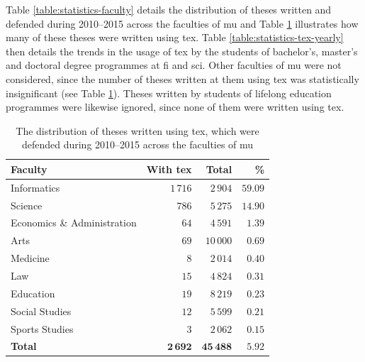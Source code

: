 \documentclass[digital,table,color]{fithesis3/fithesis3}
\begin{document}
  Table \ref{table:statistics-faculty} details the distribution of
  theses written and defended during 2010--2015 across the
  faculties of \gls{mu} and Table \ref{table:statistics-tex}
  illustrates how many of these theses were written using
  \gls{tex}. Table \ref{table:statistics-tex-yearly} then details
  the trends in the usage of \gls{tex} by the students of
  bachelor's, master's and doctoral degree programmes at \gls{fi}
  and \gls{sci}. Other faculties of \gls{mu} were not considered,
  since the number of theses written at them using \gls{tex} was
  statistically insignificant (see Table
  \ref{table:statistics-tex}). Theses written by students of
  lifelong education programmes were likewise ignored, since none
  of them were written using \gls{tex}.

  \begin{table}
    \caption{The distribution of theses written using \gls{tex},
      which were defended during 2010--2015 across the faculties of
      \acrshort{mu}}
    \begin{tabularx}{\textwidth}{Xrrr}
      \textbf{Faculty} & \textbf{With \gls{tex}} & \textbf{Total} &
      \textbf{\%} \\
      \toprule
      Informatics                 & $1\,716$ & $2\,904$  &
      $59.09$ \\%
      Science                     & $786$     & $5\,275$  &
      $14.90$ \\%
      Economics \& Administration & $64$      & $4\,591$  &
      $1.39$  \\%
      Arts                        & $69$      & $10\,000$ &
      $0.69$  \\%
      Medicine                    & $8$       & $2\,014$  &
      $0.40$  \\%
      Law                         & $15$      & $4\,824$  &
      $0.31$  \\%
      Education                   & $19$      & $8\,219$  &
      $0.23$  \\%
      Social Studies              & $12$      & $5\,599$  &
      $0.21$  \\%
      Sports Studies              & $3$       & $2\,062$  &
      $0.15$  \\%
      \bottomrule
      \textbf{Total} & $\mathbf{2\,692}$ & $\mathbf{45\,488}$ &
      $\mathbf{5.92}$
    \end{tabularx}
    \label{table:statistics-tex}
  \end{table}
\end{document}
